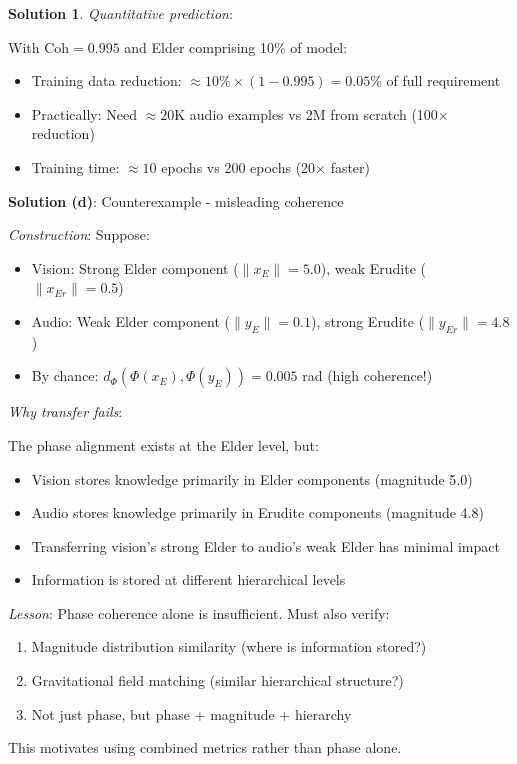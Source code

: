 \documentclass[12pt,a4paper]{article}
\theoremstyle{definition}
\newtheorem{solution}{Solution}[section]
\theoremstyle{remark}
\begin{document}
\begin{solution}
\textit{Quantitative prediction}:

With $\text{Coh} = 0.995$ and Elder comprising 10\% of model:
\begin{itemize}
\item Training data reduction: $\approx 10\% \times (1 - 0.995) = 0.05\%$ of full requirement
\item Practically: Need $\approx 20$K audio examples vs 2M from scratch (100× reduction)
\item Training time: $\approx 10$ epochs vs 200 epochs (20× faster)
\end{itemize}

\textbf{Solution (d)}: Counterexample - misleading coherence

\textit{Construction}: Suppose:
\begin{itemize}
\item Vision: Strong Elder component ($\|x_E\| = 5.0$), weak Erudite ($\|x_{Er}\| = 0.5$)
\item Audio: Weak Elder component ($\|y_E\| = 0.1$), strong Erudite ($\|y_{Er}\| = 4.8$)
\item By chance: $d_{\Phi}(\Phi(x_E), \Phi(y_E)) = 0.005$ rad (high coherence!)
\end{itemize}

\textit{Why transfer fails}:

The phase alignment exists at the Elder level, but:
\begin{itemize}
\item Vision stores knowledge primarily in Elder components (magnitude 5.0)
\item Audio stores knowledge primarily in Erudite components (magnitude 4.8)  
\item Transferring vision's strong Elder to audio's weak Elder has minimal impact
\item Information is stored at different hierarchical levels
\end{itemize}

\textit{Lesson}: Phase coherence alone is insufficient. Must also verify:
\begin{enumerate}
\item Magnitude distribution similarity (where is information stored?)
\item Gravitational field matching (similar hierarchical structure?)
\item Not just phase, but phase + magnitude + hierarchy
\end{enumerate}

This motivates using combined metrics rather than phase alone.
\end{solution}
\end{document}
